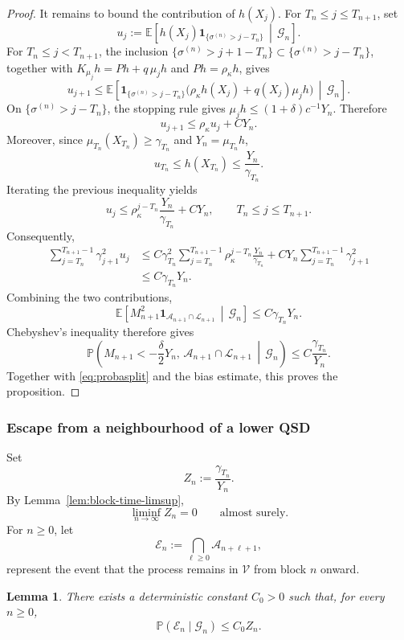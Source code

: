 \documentclass[10pt,letterpaper]{article}
\theoremstyle{compactplain}
\newtheorem{lemma}[theorem]{Lemma}
\theoremstyle{compactdefinition}
\newcommand{\1}{\mathds{1}}
\begin{document}
\begin{proof}
It remains to bound the contribution of \(h(X_j)\). For \(T_n\leq j\leq
T_{n+1}\), set
\[
u_j
:=
\mathbb E\left[
h(X_j)\mathbf 1_{\{\sigma^{(n)}>j-T_n\}}
\,\middle|\,
\mathcal G_n
\right].
\]
For \(T_n\leq j<T_{n+1}\), the inclusion
\(\{\sigma^{(n)}>j+1-T_n\}\subset\{\sigma^{(n)}>j-T_n\}\), together with
\(K_{\mu_j}h=Ph+q\,\mu_jh\) and \(Ph=\rho_\kappa h\), gives
\[
u_{j+1}
\leq
\mathbb E\left[
\mathbf 1_{\{\sigma^{(n)}>j-T_n\}}
\bigl(\rho_\kappa h(X_j)+q(X_j)\mu_jh\bigr)
\,\middle|\,
\mathcal G_n
\right].
\]
On \(\{\sigma^{(n)}>j-T_n\}\), the stopping rule gives
\(\mu_jh\leq (1+\delta)c^{-1}Y_n\). Therefore
\[
u_{j+1}\leq \rho_\kappa u_j+CY_n.
\]
Moreover, since \(\mu_{T_n}(X_{T_n})\geq\gamma_{T_n}\) and
\(Y_n=\mu_{T_n}h\),
\[
u_{T_n}\leq h(X_{T_n})\leq \frac{Y_n}{\gamma_{T_n}}.
\]
Iterating the previous inequality yields
\[
u_j
\leq
\rho_\kappa^{j-T_n}\frac{Y_n}{\gamma_{T_n}}
+
CY_n,
\qquad T_n\leq j\leq T_{n+1}.
\]
Consequently,
\[
\begin{aligned}
\sum_{j=T_n}^{T_{n+1}-1}\gamma_{j+1}^2u_j
&\leq
C\gamma_{T_n}^2
\sum_{j=T_n}^{T_{n+1}-1}
\rho_\kappa^{j-T_n}
\frac{Y_n}{\gamma_{T_n}}
+
CY_n
\sum_{j=T_n}^{T_{n+1}-1}\gamma_{j+1}^2  \\
&\leq
C\gamma_{T_n}Y_n.
\end{aligned}
\]
Combining the two contributions,
\[
\mathbb E\left[
M_{n+1}^2
\mathbf 1_{\mathcal A_{n+1}\cap\mathcal L_{n+1}}
\,\middle|\,
\mathcal G_n
\right]
\leq
C\gamma_{T_n}Y_n.
\]
Chebyshev's inequality therefore gives
\[
\mathbb P\left(
M_{n+1}<-\frac{\delta}{2}Y_n,\,
\mathcal A_{n+1}\cap\mathcal L_{n+1}
\,\middle|\,
\mathcal G_n
\right)
\leq
C\frac{\gamma_{T_n}}{Y_n}.
\]
Together with \eqref{eq:probasplit} and the bias estimate, this proves the proposition.
\end{proof}

\subsubsection{Escape from a neighbourhood of a lower QSD}
Set
\[
Z_n:=\frac{\gamma_{T_n}}{Y_n}.
\]
By Lemma~\ref{lem:block-time-limsup},
\[
\liminf_{n\to\infty}Z_n=0
\qquad\text{almost surely}.
\]
For \(n\geq0\), let
\[
\mathcal E_n
:=
\bigcap_{\ell\geq 0}\mathcal A_{n+\ell+1},
\]
represent the event that the process remains in \(\mathcal V\) from block \(n\) onward.

\begin{lemma}
\label{lem:escape-small-Z}
There exists a deterministic constant \(C_0>0\) such that, for every
\(n\geq0\),
\[
\mathbb P(\mathcal E_n\mid\mathcal G_n)
\leq
C_0 Z_n.
\]
\end{lemma}
\end{document}
